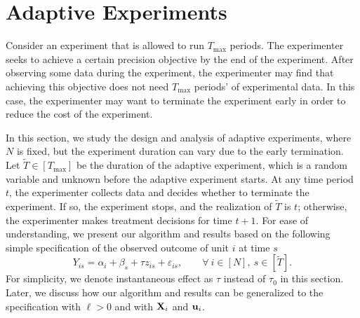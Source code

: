 
\section{Adaptive Experiments}\label{sec:sequential-experiment}

Consider an experiment that is allowed to run $T_{\max}$ periods. The experimenter seeks to achieve a certain precision objective by the end of the experiment. After observing some data during the experiment, the experimenter may find that achieving this objective does not need $T_{\max}$ periods' of experimental data. In this case, the experimenter may want to terminate the experiment early in order to reduce the cost of the experiment. 

In this section, we study the design and analysis of adaptive experiments, where $N$ is fixed, but the experiment duration can vary due to the early termination. Let $\tilde{T} \in [T_{\max}]$ be the duration of the adaptive experiment, which is a random variable and unknown before the adaptive experiment starts. 
At any time period $t$, the experimenter collects data and decides whether to terminate the experiment. If so, the experiment stops, and the realization of $\tilde{T}$ is $t$; otherwise, the experimenter makes treatment decisions for time $t + 1$. For ease of understanding, we present our algorithm and results based on the following simple specification of the observed outcome of unit $i$ at time $s$
\begin{equation}\label{eqn:two-way-direct-model}
    Y_{is}  = \alpha_i +  \beta_s  + \tau z_{is}  + \varepsilon_{is}, \qquad \forall ~ i \in [N], ~ s \in [\tilde{T}].
\end{equation}
For simplicity, we denote instantaneous effect as $\tau$ instead of $\tau_0$ in this section. Later, we discuss how our algorithm and results can be generalized to the specification with $\ell > 0$ and with $\mathbf{X}_i$ and $\mathbf{u}_i$. 

